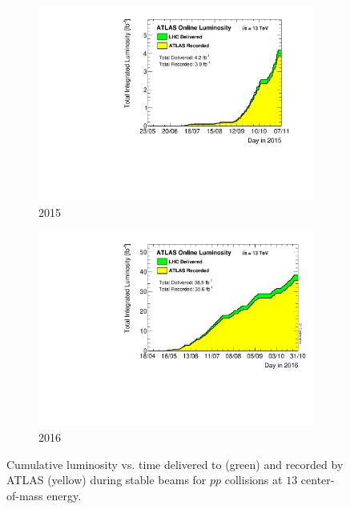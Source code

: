 \begin{figure}[htbp!]
\centering
\captionsetup{justification=centering}
	\hspace{-2cm}
    \begin{subfigure}[b]{0.35\textwidth}
        \includegraphics[width=\textwidth,angle=-90]{figures/detector/Lumi_2015}
        \caption{2015}
        \label{fig:Lumi_2015}
    \end{subfigure}
    \quad
    \quad
    \quad
    \quad
    \begin{subfigure}[b]{0.35\textwidth}
        \includegraphics[width=\textwidth,angle=-90]{figures/detector/Lumi_2016}
        \caption{2016}
        \label{fig:Lumi_2016}
    \end{subfigure}
\caption{Cumulative luminosity vs. time delivered to (green) and recorded by ATLAS (yellow) during stable beams for $pp$ collisions at $13$ \TeV center-of-mass energy.}
\label{fig:Lumi}
\end{figure}






